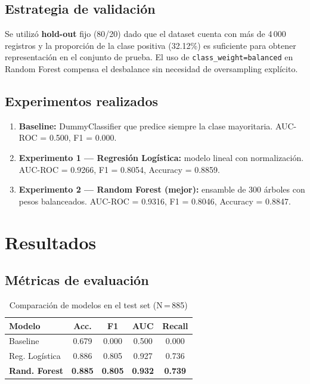 \documentclass[10pt,twocolumn]{article}
\begin{document}
\subsection{Estrategia de validación}

Se utilizó \textbf{hold-out} fijo (80/20) dado que el dataset cuenta con
más de 4\,000 registros y la proporción de la clase positiva (32.12\%) es
suficiente para obtener representación en el conjunto de prueba. El uso de
\texttt{class\_weight=balanced} en Random Forest compensa el desbalance
sin necesidad de oversampling explícito.

\subsection{Experimentos realizados}

\begin{enumerate}[leftmargin=*,topsep=2pt,itemsep=2pt]
  \item \textbf{Baseline:} DummyClassifier que predice siempre la clase
        mayoritaria. AUC-ROC = 0.500, F1 = 0.000.
  \item \textbf{Experimento 1 — Regresión Logística:} modelo lineal con
        normalización. AUC-ROC = 0.9266, F1 = 0.8054, Accuracy = 0.8859.
  \item \textbf{Experimento 2 — Random Forest (mejor):} ensamble de 300
        árboles con pesos balanceados. AUC-ROC = 0.9316, F1 = 0.8046,
        Accuracy = 0.8847.
\end{enumerate}

\section{Resultados}

\subsection{Métricas de evaluación}

\begin{table}[H]
\centering
\caption{Comparación de modelos en el test set (N\,=\,885)}
\label{tab:resultados}
\begin{tabular}{lcccc}
\toprule
\textbf{Modelo} & \textbf{Acc.} & \textbf{F1} & \textbf{AUC} & \textbf{Recall} \\
\midrule
Baseline         & 0.679 & 0.000 & 0.500 & 0.000 \\
Reg. Logística   & 0.886 & 0.805 & 0.927 & 0.736 \\
\textbf{Rand. Forest} & \textbf{0.885} & \textbf{0.805} & \textbf{0.932} & \textbf{0.739} \\
\bottomrule
\end{tabular}
\end{table}
\end{document}
